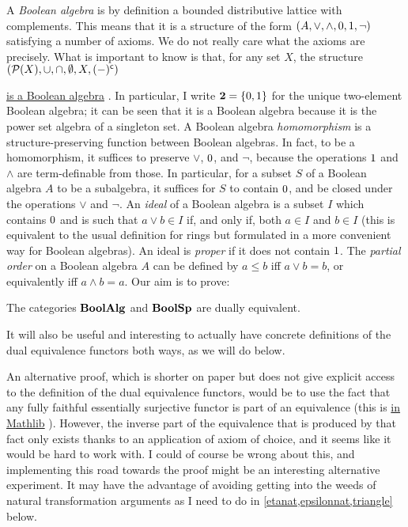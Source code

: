 \documentclass[a4paper,10pt]{article}
\numberwithin{theorem}{section}
\newcommand{\docref}[3]{
    \href{
        https://leanprover-community.github.io/mathlib4_docs/Mathlib/#1.html\##2
    }{#3}
}
\begin{document}
A \emph{Boolean algebra} is by definition a bounded distributive lattice with
complements. This means that it is a structure of the form $(A, \vee, \wedge,
0, 1, \neg)$ satisfying a number of axioms. We do not really care what
the axioms are precisely. What is important to know is that, for any set $X$,
the structure $(\mathcal{P}(X), \cup, \cap, \emptyset, X, (-)^{\mathsf{c}})$
\docref{Data/Set/Basic}{Set.instBooleanAlgebraSet}{is a Boolean algebra}.
In particular, I write $\mathbf{2} = \{ 0, 1 \}$ for the unique two-element
Boolean algebra; it can be seen that it is a Boolean algebra because it is the
power set algebra of a singleton set. A Boolean algebra \emph{homomorphism} is
a structure-preserving function between Boolean algebras. In fact, to be a
homomorphism, it suffices to preserve $\vee$, $0$, and $\neg$, because the
operations $1$ and $\wedge$ are term-definable from those. In particular,
for a subset $S$ of a Boolean algebra $A$ to be a subalgebra, it suffices for
$S$ to contain $0$, and be closed under the operations $\vee$ and $\neg$. An
\emph{ideal} of a Boolean algebra is a subset $I$ which contains $0$ and is
such that $a \vee b \in I$ if, and only if, both $a \in I$ and $b \in I$ (this
is equivalent to the usual definition for rings but formulated in a more
convenient way for Boolean algebras). An ideal is \emph{proper} if it does not
contain $1$. The \emph{partial order} on a Boolean algebra $A$ can be
defined by $a \leq b$ iff $a \vee b = b$, or equivalently  iff $a \wedge b =
a$. Our aim is to prove:
\begin{theorem}\label{BABoolSpdualeq} The categories $\mathbf{BoolAlg}$ and $\mathbf{BoolSp}$
    are dually equivalent.
\end{theorem}
It will also be useful and interesting to actually have concrete definitions of
the dual equivalence functors both ways, as we will do below. 
\begin{remark}
An alternative proof, which is shorter on paper but does not give explicit
access to the definition of the dual equivalence functors, would be to use the
fact that any fully faithful essentially surjective functor is part of an
equivalence (this is \docref{CategoryTheory/Equivalence}
{CategoryTheory.Equivalence.ofFullyFaithfullyEssSurj}{in Mathlib}). However,
the inverse part of the equivalence that is produced by that fact only exists
thanks to an application of axiom of choice, and it seems like it would be hard
to work with. I could of course be wrong about this, and implementing this road
towards the proof might be an interesting alternative experiment. It may have
the advantage of avoiding getting into the weeds of natural transformation
arguments as I need to do in \cref{etanat,epsilonnat,triangle} below.
\end{remark}
\end{document}
